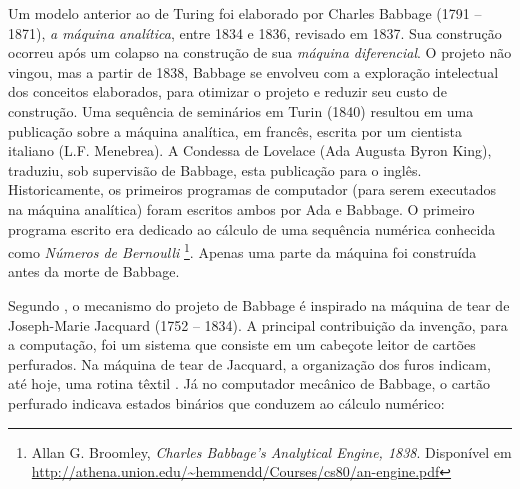  Um modelo anterior ao de Turing foi elaborado por Charles Babbage (1791 -- 1871), \emph{a máquina analítica},  entre 1834 e 1836, revisado em 1837. Sua construção ocorreu após um colapso na construção de sua \emph{máquina diferencial}. O projeto não vingou, mas a partir de 1838, Babbage se envolveu com a exploração intelectual dos conceitos elaborados, para otimizar o projeto e reduzir seu custo de construção. Uma sequência de seminários em Turin (1840) resultou em uma publicação sobre a máquina analítica, em francês, escrita por um cientista italiano (L.F. Menebrea). A Condessa de Lovelace (Ada Augusta Byron King), traduziu, sob supervisão de Babbage, esta publicação para o inglês. Historicamente, os primeiros programas de computador (para serem executados na máquina analítica) foram escritos ambos por Ada e Babbage. O primeiro programa escrito era dedicado ao cálculo de uma sequência numérica conhecida como \emph{Números de Bernoulli} \footnote{Allan G. Broomley, \emph{Charles Babbage’s Analytical Engine, 1838}. Disponível em \url{http://athena.union.edu/~hemmendd/Courses/cs80/an-engine.pdf}}. Apenas uma parte da máquina foi construída antes da morte de Babbage.

Segundo , o mecanismo do projeto de Babbage é inspirado na máquina de tear de Joseph-Marie Jacquard (1752 -- 1834). A principal contribuição da invenção, para a computação, foi um sistema que consiste em um cabeçote leitor de cartões perfurados. Na máquina de tear de Jacquard, a organização dos furos indicam, até hoje, uma rotina têxtil . Já no computador mecânico de Babbage, o cartão perfurado indicava estados binários que conduzem ao cálculo numérico:

